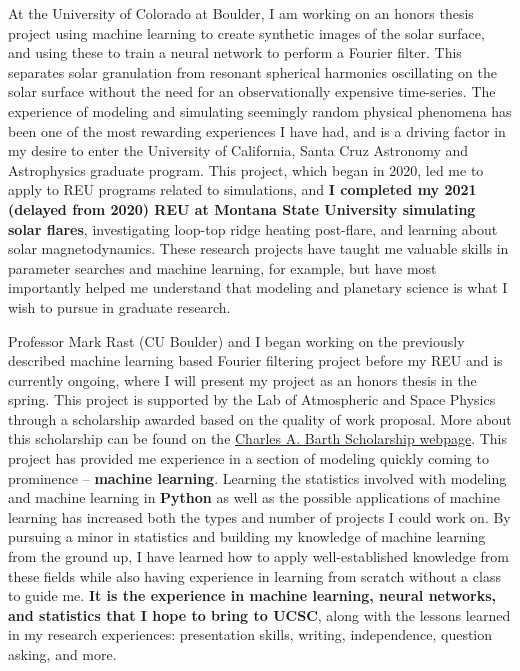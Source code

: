 \documentclass[11pt,letterpaper]{article}
\begin{document}
At the University of Colorado at Boulder, I am working on an honors thesis project using machine learning to create synthetic images of the solar surface, and using these to train a neural network to perform a Fourier filter. This separates solar granulation from resonant spherical harmonics oscillating on the solar surface without the need for an observationally expensive time-series. The experience of modeling and simulating seemingly random physical phenomena has been one of the most rewarding experiences I have had, and is a driving factor in my desire to enter the University of California, Santa Cruz Astronomy and Astrophysics graduate program. This project, which began in 2020, led me to apply to REU programs related to simulations, and \textbf{I completed my 2021 (delayed from 2020) REU at Montana State University simulating solar flares}, investigating loop-top ridge heating post-flare, and learning about solar magnetodynamics. These research projects have taught me valuable skills in parameter searches and machine learning, for example, but have most importantly helped me understand that modeling and planetary science is what I wish to pursue in graduate research.
 
Professor Mark Rast (CU Boulder) and I began working on the previously described machine learning based Fourier filtering project before my REU and is currently ongoing, where I will present my project as an honors thesis in the spring. This project is supported by the Lab of Atmospheric and Space Physics through a scholarship awarded based on the quality of work proposal. More about this scholarship can be found on the \href{https://lasp.colorado.edu/home/about/scholarships-and-fellowships/the-charles-a-barth-scholarship-in-space-research/}{Charles A. Barth Scholarship webpage}. This project has provided me experience in a section of modeling quickly coming to prominence -- \textbf{machine learning}. Learning the statistics involved with modeling and machine learning in \textbf{Python} as well as the possible applications of machine learning has increased both the types and number of projects I could work on. By pursuing a minor in statistics and building my knowledge of machine learning from the ground up, I have learned how to apply well-established knowledge from these fields while also having experience in learning from scratch without a class to guide me. \textbf{It is the experience in machine learning, neural networks, and statistics that I hope to bring to UCSC}, along with the lessons learned in my research experiences: presentation skills, writing, independence, question asking, and more.
\end{document}
